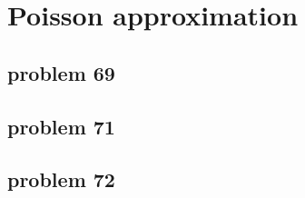 \section{Poisson approximation}

\subsection{problem 69}


\subsection{problem 71}


\subsection{problem 72}

